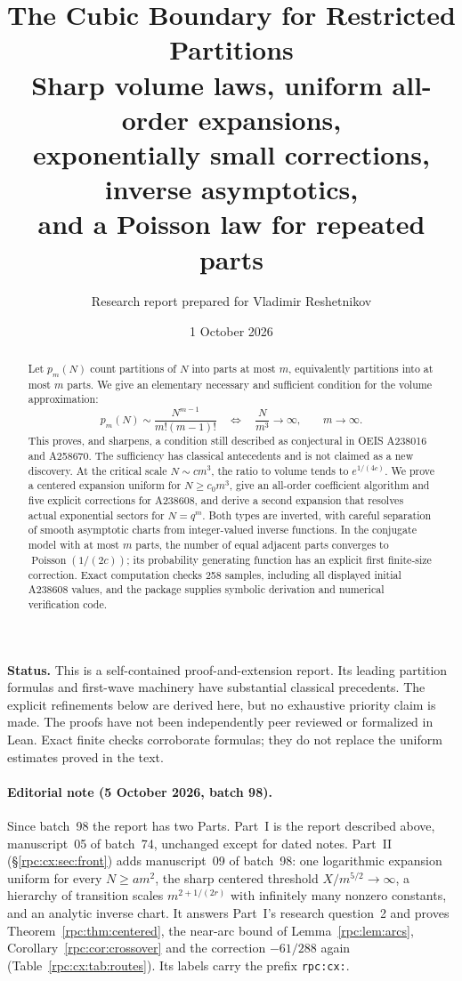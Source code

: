 \documentclass[11pt]{article}
\title{\color{inkblue}\textbf{The Cubic Boundary for Restricted Partitions}\\[5pt]
\large Sharp volume laws, uniform all-order expansions,\\
exponentially small corrections, inverse asymptotics,\\
and a Poisson law for repeated parts}
\author{Research report prepared for Vladimir Reshetnikov}
\date{1 October 2026}
\theoremstyle{definition}
\theoremstyle{remark}
\DeclareMathOperator{\Pois}{Poisson}
\numberwithin{equation}{section}
\begin{document}
\maketitle
\begin{abstract}
Let $p_m(N)$ count partitions of $N$ into parts at most $m$, equivalently
partitions into at most $m$ parts. We give an elementary necessary and sufficient
condition for the volume approximation:
\[
 p_m(N)\sim\frac{N^{m-1}}{m!(m-1)!}
 \quad\Longleftrightarrow\quad \frac{N}{m^3}\longrightarrow\infty,
 \qquad m\longrightarrow\infty.
\]
This proves, and sharpens, a condition still described as conjectural in
OEIS A238016 and A258670. The sufficiency has classical antecedents and is not
claimed as a new discovery. At the critical scale $N\sim c m^3$, the ratio to
volume tends to $e^{1/(4c)}$. We prove a centered expansion uniform for
$N\ge c_0m^3$, give an all-order coefficient algorithm and five explicit
corrections for A238608, and derive a second expansion that resolves actual
exponential sectors for $N=q^m$. Both types are inverted, with careful
separation of smooth asymptotic charts from integer-valued inverse functions.
In the conjugate model with at most $m$ parts, the number of equal adjacent
parts converges to $\Pois(1/(2c))$; its probability generating function has an
explicit first finite-size correction. Exact computation checks 258 samples,
including all displayed initial A238608 values, and the package supplies
symbolic derivation and numerical verification code.
\end{abstract}

\noindent\textbf{Status.} This is a self-contained proof-and-extension report.
Its leading partition formulas and first-wave machinery have substantial
classical precedents. The explicit refinements below are derived here, but no
exhaustive priority claim is made. The proofs have not been independently
peer reviewed or formalized in Lean. Exact finite checks corroborate formulas;
they do not replace the uniform estimates proved in the text.

\paragraph{Editorial note (5 October 2026, batch 98).}
Since batch~98 the report has two Parts. Part~I is the report described
above, manuscript~05 of batch~74, unchanged except for dated notes.
Part~II (\S\ref{rpc:cx:sec:front}) adds manuscript~09 of batch~98: one
logarithmic expansion uniform for every $N\ge am^2$, the sharp centered
threshold $X/m^{5/2}\to\infty$, a hierarchy of transition scales
$m^{2+1/(2r)}$ with infinitely many nonzero constants, and an analytic
inverse chart. It answers Part~I's research question~2 and proves
Theorem~\ref{rpc:thm:centered}, the near-arc bound of
Lemma~\ref{rpc:lem:arcs}, Corollary~\ref{rpc:cor:crossover} and the
correction $-61/288$ again (Table~\ref{rpc:cx:tab:routes}). Its labels carry
the prefix \texttt{rpc:cx:}.
\end{document}
